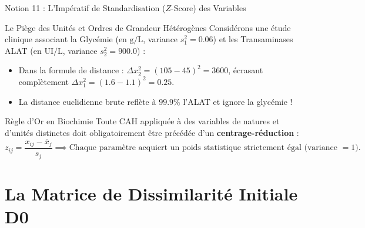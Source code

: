 \documentclass[aspectratio=169,10pt]{beamer}
\begin{document}
\begin{frame}{Notion 11 : L'Impératif de Standardisation ($Z$-Score) des Variables}
  \begin{conceptbox}{Le Piège des Unités et Ordres de Grandeur Hétérogènes}
    \footnotesize
    Considérons une étude clinique associant la Glycémie (en $\text{g/L}$, variance $s_1^2 = 0.06$) et les Transaminases ALAT (en $\text{UI/L}$, variance $s_2^2 = 900.0$) :
    \begin{itemize}
      \item Dans la formule de distance : $\Delta x_2^2 = (105 - 45)^2 = 3600$, écrasant complètement $\Delta x_1^2 = (1.6 - 1.1)^2 = 0.25$.
      \item La distance euclidienne brute reflète à $99.9\%$ l'ALAT et ignore la glycémie !
    \end{itemize}
  \end{conceptbox}
  \vspace{1mm}
  \begin{biobox}{Règle d'Or en Biochimie}
    \footnotesize
    Toute CAH appliquée à des variables de natures et d'unités distinctes doit obligatoirement être précédée d'un \textbf{centrage-réduction} :
    \begin{equation*}
      z_{ij} = \frac{x_{ij} - \bar{x}_j}{s_j} \implies \text{Chaque paramètre acquiert un poids statistique strictement égal (variance } = 1\text{).}
    \end{equation*}
  \end{biobox}
\end{frame}

\section{La Matrice de Dissimilarité Initiale D0}
\end{document}
